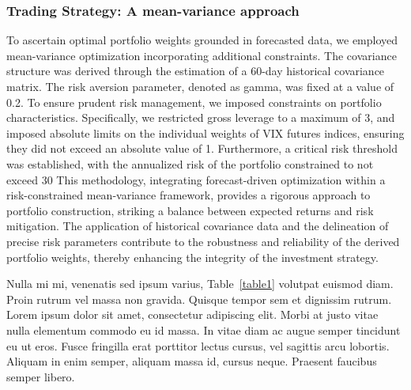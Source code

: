 \documentclass[10pt,letterpaper]{article}
\begin{document}
\subsubsection*{Trading Strategy: A mean-variance approach}
To ascertain optimal portfolio weights grounded in forecasted data, we employed mean-variance optimization incorporating additional constraints. The covariance structure was derived through the estimation of a 60-day historical covariance matrix. The risk aversion parameter, denoted as gamma, was fixed at a value of 0.2.
To ensure prudent risk management, we imposed constraints on portfolio characteristics. Specifically, we restricted gross leverage to a maximum of 3, and imposed absolute limits on the individual weights of VIX futures indices, ensuring they did not exceed an absolute value of 1. Furthermore, a critical risk threshold was established, with the annualized risk of the portfolio constrained to not exceed 30%
This methodology, integrating forecast-driven optimization within a risk-constrained mean-variance framework, provides a rigorous approach to portfolio construction, striking a balance between expected returns and risk mitigation. The application of historical covariance data and the delineation of precise risk parameters contribute to the robustness and reliability of the derived portfolio weights, thereby enhancing the integrity of the investment strategy.













Nulla mi mi, venenatis sed ipsum varius, Table~\ref{table1} volutpat euismod diam. Proin rutrum vel massa non gravida. Quisque tempor sem et dignissim rutrum. Lorem ipsum dolor sit amet, consectetur adipiscing elit. Morbi at justo vitae nulla elementum commodo eu id massa. In vitae diam ac augue semper tincidunt eu ut eros. Fusce fringilla erat porttitor lectus cursus, vel sagittis arcu lobortis. Aliquam in enim semper, aliquam massa id, cursus neque. Praesent faucibus semper libero.
\end{document}
